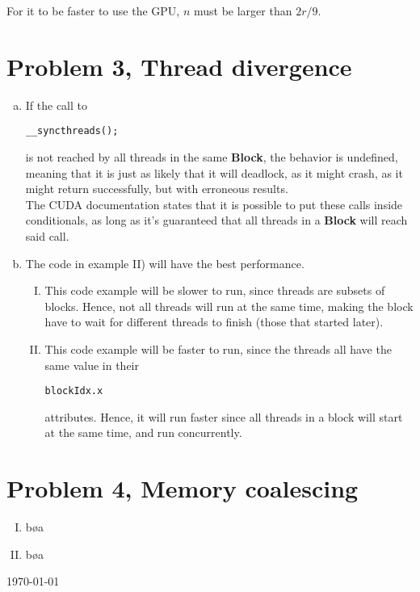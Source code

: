\documentclass[fontsize=11pt, paper=a4, titlepage]{article}
\begin{document}
For it to be faster to use the GPU, $n$ must be larger than $2r/9$.

\section*{Problem 3, Thread divergence}
\begin{enumerate}[a)]

    \item If the call to
\begin{lstlisting}[numbers=none]
__syncthreads();
\end{lstlisting}
is not reached by all threads in the same \textbf{Block}, the behavior is
undefined, meaning that it is just as likely that it will deadlock, as it might
crash, as it might return successfully, but with erroneous results. \\

The CUDA documentation states that it is possible to put these calls inside
conditionals, as long as it's guaranteed that all threads in a \textbf{Block}
will reach said call.

    \item The code in example II) will have the best performance.

    \begin{enumerate}[I)]

        \item This code example will be slower to run, since threads are
subsets of blocks. Hence, not all threads will run at the same time, making the
block have to wait for different threads to finish (those that started later).

        \item This code example will be faster to run, since the threads all
have the same value in their \begin{lstlisting}[numbers=none]
blockIdx.x
\end{lstlisting}
attributes. Hence, it will run faster since all threads in a block will start at
the same time, and run concurrently.

    \end{enumerate}
\end{enumerate}

\section*{Problem 4, Memory coalescing}
\begin{enumerate}[I)]

    \item bøa

    \item bøa

\end{enumerate}

\vfill
\hfill \large{\today}
\end{document}
